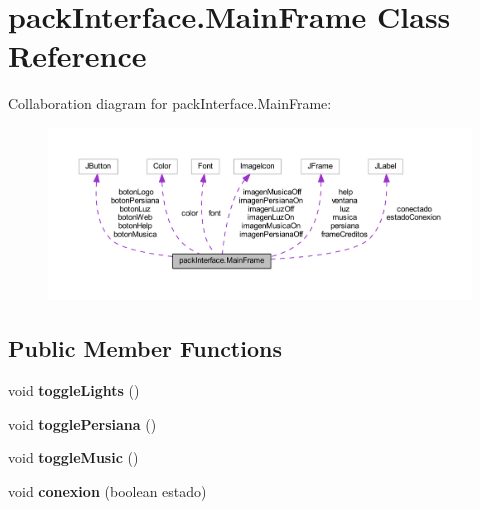 \hypertarget{classpack_interface_1_1_main_frame}{}\section{pack\+Interface.\+Main\+Frame Class Reference}
\label{classpack_interface_1_1_main_frame}


Collaboration diagram for pack\+Interface.\+Main\+Frame\+:
\nopagebreak
\begin{figure}[H]
\begin{center}
\leavevmode
\includegraphics[width=350pt]{classpack_interface_1_1_main_frame__coll__graph}
\end{center}
\end{figure}
\subsection*{Public Member Functions}
\begin{DoxyCompactItemize}
\item 
\mbox{\label{classpack_interface_1_1_main_frame_a4201e4a79d5b48a8cc3b72baf74d719e}} 
void {\bfseries toggle\+Lights} ()
\item 
\mbox{\label{classpack_interface_1_1_main_frame_a7b194ecb7dafadd0728ecf81bcc6056d}} 
void {\bfseries toggle\+Persiana} ()
\item 
\mbox{\label{classpack_interface_1_1_main_frame_a90d3cc9d32aa54e8401a9c28f938db26}} 
void {\bfseries toggle\+Music} ()
\item 
\mbox{\label{classpack_interface_1_1_main_frame_a2c1b89055920c04cdcf61c2be598ee1c}} 
void {\bfseries conexion} (boolean estado)
\end{DoxyCompactItemize}
